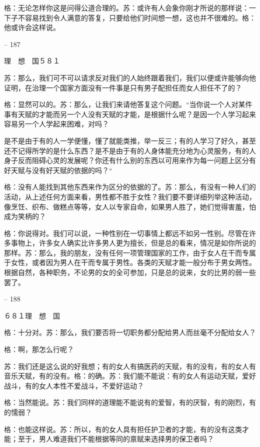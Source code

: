 \documentclass[11pt,oneside]{book}
\begin{document}
\begin{common-format}
    格：无论怎样你这是问得公道合理的。苏：或许有人会象你刚才所说的那样说：一下子不容易找到令人满意的答复，只要给他们时间想一想，这也并不很难的。格：他或许会这样说。

    

-- 187

    理　想　国５８１

    苏：那么，我们可不可以请求反对我们的人始终跟着我们，我们以便或许能够向他证明，在治理一个国家方面没有一件事是只有男子配担任而女人担任不了的？

    格：显然可以的。苏：那么，让我们来请他答复这个问题。“当你说一个人对某件事有天赋的才能而另一个人没有天赋的才能，是根据什么呢？是因一个人学习起来容易另一个人学起来困难，对吗？

    是不是由于有的人一学便懂，懂了就能类推，举一反三；有的人学习了好久，甚至还不记得所学的是什么东西？是不是由于有的人身体能充分地为心灵服务，有的人身子反而阻碍心灵的发展呢？你还有什么别的东西以可用来作为每一问题上区分有好天赋与没有好天赋的依据的吗？“

    格：没有人能找到其他东西来作为区分的依据的了。苏：那么，有没有一种人们的活动，从上述任何方面来看，男性都不胜于女性？我们要不要详细列举这种活动，像烹饪、织布、做糕点等等，女人以专家自命，如果男人胜了，她们觉得害羞，怕成为笑柄的？

    格：你说得对。我们可以说，一种性别在一切事情上都远不如另一性别。尽管在许多事物上，许多女人确实比许多男人更为擅长，但是总的看来，情况是如你所说的那样。苏：那么，我的朋友，没有任何一项管理国家的工作，由于女人在干而专属于女性，或者因为男人在干而专属于男性。各类的天赋才能一般分布于男女两性。根据自然，各种职务，不论男的女的全可参加，只是总的说来，女的比男的弱一些罢了。

    

-- 188

    ６８１理　想　国

    格：十分对。苏：那么，我们要否将一切职务都分配给男人而丝毫不分配给女人？

    格：啊，那怎么行呢？

    苏：我们还是这么说的好我想；有的女人有搞医药的天赋，有的没有，有的女人有音乐天赋，有的没有。格：的确。苏：我们能不能说：有的女人有运动天赋，爱好战斗，有的女人本性不爱战斗，不爱好运动？

    格：当然能说。苏：我们同样的道理能不能说有的爱智，有的厌智，有的刚烈，有的懦弱？

    格：也能这样说。苏：所以，有的女人具有担任护卫者的才能，有的没有这类才能；至于，男人难道我们不能根据等同的禀赋来选择男的保卫者吗？


\end{common-format}
\end{document}
